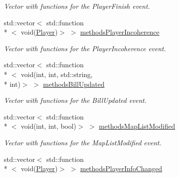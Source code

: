 \begin{DoxyCompactItemize}
\begin{DoxyCompactList}\small\item\em Vector with functions for the Player\-Finish event. \end{DoxyCompactList}\item 
\hypertarget{classEventManager_a9c473cd5e559ffd730c95fb6476890a1}{std\-::vector$<$ std\-::function\\*
$<$ void(\hyperlink{structPlayer}{Player})$>$ $>$ \hyperlink{classEventManager_a9c473cd5e559ffd730c95fb6476890a1}{methods\-Player\-Incoherence}}\label{classEventManager_a9c473cd5e559ffd730c95fb6476890a1}

\begin{DoxyCompactList}\small\item\em Vector with functions for the Player\-Incoherence event. \end{DoxyCompactList}\item 
\hypertarget{classEventManager_a0497e6be361d83e2c4dc8d0b5e20360a}{std\-::vector$<$ std\-::function\\*
$<$ void(int, int, std\-::string, \\*
int)$>$ $>$ \hyperlink{classEventManager_a0497e6be361d83e2c4dc8d0b5e20360a}{methods\-Bill\-Updated}}\label{classEventManager_a0497e6be361d83e2c4dc8d0b5e20360a}

\begin{DoxyCompactList}\small\item\em Vector with functions for the Bill\-Updated event. \end{DoxyCompactList}\item 
\hypertarget{classEventManager_a9de43e00de48971bd1299a1d77b7b649}{std\-::vector$<$ std\-::function\\*
$<$ void(int, int, bool)$>$ $>$ \hyperlink{classEventManager_a9de43e00de48971bd1299a1d77b7b649}{methods\-Map\-List\-Modified}}\label{classEventManager_a9de43e00de48971bd1299a1d77b7b649}

\begin{DoxyCompactList}\small\item\em Vector with functions for the Map\-List\-Modified event. \end{DoxyCompactList}\item 
\hypertarget{classEventManager_a390528d8f1a0f9afc6883b0633905254}{std\-::vector$<$ std\-::function\\*
$<$ void(\hyperlink{structPlayer}{Player})$>$ $>$ \hyperlink{classEventManager_a390528d8f1a0f9afc6883b0633905254}{methods\-Player\-Info\-Changed}}\label{classEventManager_a390528d8f1a0f9afc6883b0633905254}


\end{DoxyCompactItemize}
